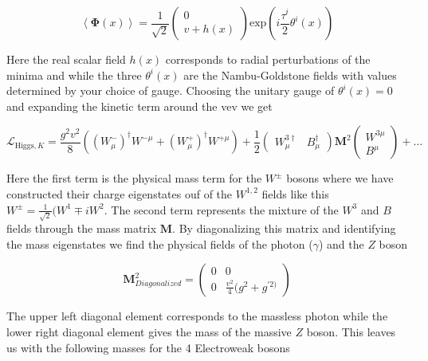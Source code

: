 \begin{equation}
\left\langle \boldsymbol{\Phi}(x) \right\rangle = \frac{1}{\sqrt{2}} \left(
\begin{matrix} 0 \\ v + h(x) \end{matrix} \right) \text{exp} \left(
i\frac{\tau^{i}}{2}\theta^{i}(x) \right)
\end{equation} 

Here the real scalar field $h(x)$ corresponds to radial perturbations of the
minima and while the three $\theta^{i}(x)$ are the Nambu-Goldstone fields with
values determined by your choice of gauge.  Choosing the unitary gauge of
$\theta^{i}(x) = 0$ and expanding the kinetic term around the vev we get

\begin{equation}
\mathcal{L}_{\text{Higgs},K} = \frac{g^{2}v^{2}}{8} \left(
(W_{\mu}^{-})^{\dagger}W^{-\mu} + (W_{\mu}^{+})^{\dagger}W^{+\mu} \right) +
\frac{1}{2} \left( \begin{matrix} W_{\mu}^{3\dagger} & B_{\mu}^{\dagger}
\end{matrix} \right) \boldsymbol{M}^{2} \left( \begin{matrix} W^{3\mu} \\ B^{\mu}
\end{matrix} \right) + \ldots 
\end{equation}

Here the first term is the physical mass term for the $W^{\pm}$ bosons where we
have constructed their charge eigenstates ouf of the $W^{1,2}$ fields like this
$W^{\pm} = \frac{1}{\sqrt{2}}(W^{1} \mp iW^{2}$.  The second term represents the
mixture of the $W^{3}$ and $B$ fields through the mass matrix $\boldsymbol{M}$.
By diagonalizing this matrix and identifying the mass eigenstates we find the
physical fields of the photon ($\gamma$) and the $Z$ boson


\begin{equation}
\boldsymbol{M}_{Diagonalized}^{2} = \left( \begin{matrix} 0 & 0 \\ 0 &
\frac{v^{2}}{4}(g^{2} + g^{'2)}   \end{matrix} \right)
\end{equation}

The upper left diagonal element corresponds to the massless photon
while the lower right diagonal element gives the mass of the massive $Z$ boson.
This leaves us with the following masses for the 4 Electroweak bosons


